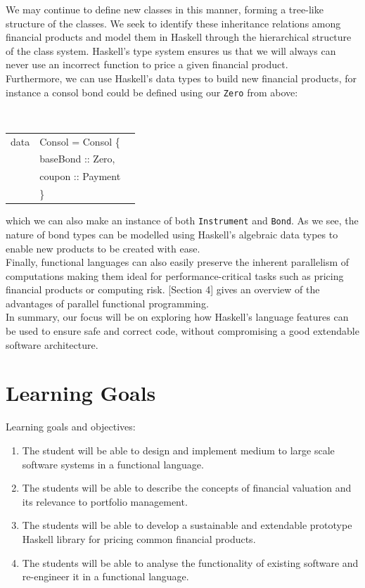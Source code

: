 \documentclass[11pt]{article}
\begin{document}
We may continue to define new classes in this manner, forming a tree-like
structure of the classes. We seek to identify these inheritance relations among
financial products and model them in Haskell through the hierarchical structure
of the class system.
Haskell's type system ensures us that we will always can never use an incorrect
function to price a given financial product.\\

Furthermore, we can use Haskell's data types to build new financial products, for instance
a consol bond could be defined using our {\tt Zero} from above:

\begin{center}
\tt
\begin{tabular}{lll}
data & Consol = Consol \{\\
      &\hspace{-1cm} baseBond :: Zero,\\
      &\hspace{-1cm} coupon   :: Payment\\
      &\hspace{-1cm}\}
\end{tabular}
\end{center}

which we can also make an instance of both {\tt Instrument} and {\tt Bond}.
As we see, the nature of bond types can be modelled using Haskell's algebraic
data types to enable new products to be created with ease.\\

Finally, functional languages can also easily preserve the inherent parallelism 
of computations making them ideal for performance-critical tasks such as pricing
financial products or computing risk. \cite{hiperfit2010}[Section 4] gives an
overview of the advantages of parallel functional programming.\\

In summary, our focus will be on exploring how Haskell's language features can be used
to ensure safe and correct code, without compromising a good extendable software architecture.

\section*{Learning Goals}

Learning goals and objectives:

\begin{enumerate}
\item The student will be able to design and implement medium to large scale software systems in a functional language. %
\item The students will be able to describe the concepts of financial valuation and its relevance to portfolio management. %
\item The students will be able to develop a sustainable and extendable prototype Haskell library for pricing common financial products. %
\item The students will be able to analyse the functionality of existing software and re-engineer it in a functional language.
\end{enumerate}
\end{document}
